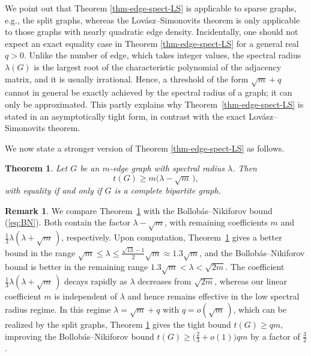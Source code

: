 \documentclass[11pt,a4paper]{article}
\newtheorem{theorem}{Theorem}[section]
\theoremstyle{definition}
\newtheorem{remark}{Remark}
\theoremstyle{plain}
\renewcommand{\le}{\leqslant}
\renewcommand{\geq}{\geqslant}
\renewcommand{\ge}{\geqslant}
\begin{document}
  We point out that Theorem \ref{thm-edge-spect-LS} is applicable to sparse graphs, e.g., the split graphs, whereas the Lov\'{a}sz--Simonovits theorem is only applicable to those graphs with nearly quadratic edge density.  
Incidentally, one should not expect an exact equality case in Theorem \ref{thm-edge-spect-LS} for a general real $q>0$. 
Unlike the number of edge, which takes integer values, the spectral
radius $\lambda(G)$ is the largest root of the characteristic polynomial of the adjacency matrix, and it is usually irrational. Hence, a threshold of the form $\sqrt{m}+q$ cannot in general be exactly achieved by the spectral radius of a graph; it can only be approximated. This partly explains why Theorem~\ref{thm-edge-spect-LS} is stated in an 
asymptotically tight form, in contrast with the exact Lov\'{a}sz--Simonovits theorem.  

\smallskip 
We now state a stronger version of Theorem \ref{thm-edge-spect-LS} as follows. 

\begin{theorem} \label{thm:strong}
Let $G$ be an $m$-edge graph with spectral radius $\lambda$.   
Then
\[
    t(G)\geq m\bigl(\lambda -\sqrt m\, \bigr),
\]
with equality if and only if $G$ is a complete bipartite graph. 
\end{theorem}


\begin{remark}   
We compare Theorem~\ref{thm:strong} with the Bollob\'{a}s--Nikiforov bound (\ref{eq:BN}). Both contain the factor $\lambda-\sqrt m$, 
with remaining coefficients $m$ and
$\frac13\lambda(\lambda+\sqrt m\,)$, respectively. 
Upon computation, Theorem~\ref{thm:strong} gives a better bound in the range $ \sqrt m\le \lambda\le \frac{\sqrt{13}-1}{2}\sqrt m\approx 1.3\sqrt{m}$, 
and the Bollob\'{a}s--Nikiforov bound is better in the remaining range $1.3\sqrt{m} < \lambda <  \sqrt{2m}$. 
The coefficient $\tfrac13\lambda(\lambda+\sqrt m\,)$
decays rapidly as $\lambda$ decreases from $\sqrt{2m}$, whereas our linear
coefficient $m$ is independent of $\lambda$ and hence remains effective in the
low spectral radius regime. 
In this regime $\lambda=\sqrt m+q$ with $q=o(\sqrt m\,)$, which can be realized by the split graphs,  
 Theorem \ref{thm:strong} gives the tight bound  $t(G)\ge qm$, 
improving the Bollob\'{a}s--Nikiforov bound  
$t(G)\ge \big(\frac23+o(1)\big)qm$ by a factor of $\frac{3}{2}$.  
\end{remark}
 
\end{document}
